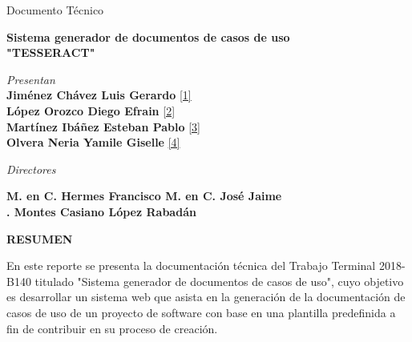 \documentclass[12pt]{report}
\begin{document}
\begin{center}
	\begin{normalsize}
		Documento Técnico\\
	\end{normalsize}
	\vspace*{0.2in}	
	\begin{large}
		\textbf {Sistema generador de documentos de casos de uso\\
			"TESSERACT"}\\
	\end{large}
	\vspace*{0.3in}
	\begin{large}	
		\textit {Presentan}\\
		\textbf {Jiménez Chávez Luis Gerardo} \hyperlink{x01}{[1]}\\
		\textbf {López Orozco Diego Efrain} \hyperlink{x02}{[2]}\\
		\textbf {Martínez Ibáñez Esteban Pablo} \hyperlink{x03}{[3]}\\
		\textbf {Olvera Neria Yamile Giselle} \hyperlink{x04}{[4]}\\
	\end{large}
	\vspace*{0.3in}
	\begin{large}	
		\textit {Directores}\\
	\end{large}
	
	\begin{normalsize}
		\textbf {M. en C. Hermes Francisco \hspace{1.5cm} M. en C. José Jaime\\
			.\hspace{0.6cm} Montes Casiano \hspace{2.8cm} López Rabadán }
	\end{normalsize}
	\vspace*{0.3in}
	\begin{large}	
	\textbf {RESUMEN}\\
	\end{large}
\end{center}
	\begin{normalsize}
		En este reporte se presenta la documentación técnica del Trabajo Terminal 2018-B140 titulado
		"Sistema generador de documentos de casos de uso", cuyo objetivo es desarrollar un sistema web que asista en la generación de la documentación de casos de uso de un proyecto de software con base en una plantilla predefinida a fin de contribuir en su proceso de creación.\\ 	
	\end{normalsize}
\end{document}
